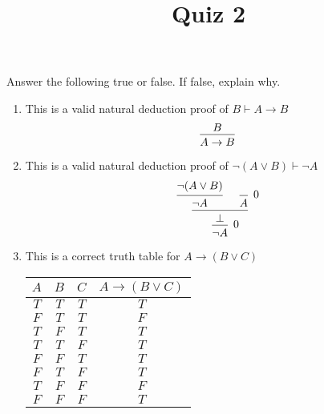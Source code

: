 \documentclass[12pt]{amsart}
\theoremstyle{definition}
\begin{document}
\title{Quiz 2}

\maketitle

Answer the following true or false. If false, explain why.

\begin{enumerate}
\item This is a valid natural deduction proof of $B \vdash A \to B$
\begin{displaymath}
\begin{prooftree}
	\hypo{B}
	\infer1{A \to B}
\end{prooftree}
\end{displaymath}

\item This is a valid natural deduction proof of $\neg (A \lor B) \vdash \neg A$ 
\begin{displaymath}
\begin{prooftree}
	\hypo{\neg (A \lor B)}
	\infer1{\neg A}
	\infer0[0]{A}
	\infer2{\bot}
	\infer1[0]{\neg A}
\end{prooftree}
\end{displaymath}

\item This is a correct truth table for $A \to (B \lor C)$  
\begin{center}
\begin{tabular}{| c | c | c | c |}
	\hline
	$A$ & $B$ & $C$ & $A \to (B \lor C)$ \\
	\hline
	$T$ & $T$ & $T$ & $T$ \\
	\hline
	$F$ & $T$ & $T$ & $F$ \\
	\hline
	$T$ & $F$ & $T$ & $T$ \\
	\hline
	$T$ & $T$ & $F$ & $T$ \\
	\hline
	$F$ & $F$ & $T$ & $T$ \\
	\hline
	$F$ & $T$ & $F$ & $T$ \\
	\hline
	$T$ & $F$ & $F$ & $F$ \\
	\hline
	$F$ & $F$ & $F$ & $T$ \\
	\hline
\end{tabular}
\end{center}

\end{enumerate}
\end{document}
